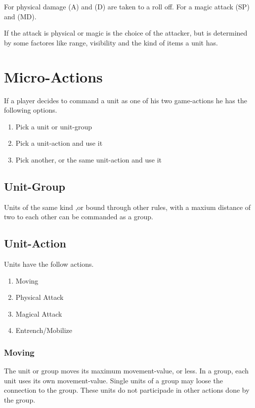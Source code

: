 \documentclass[a5paper,pagesize,10pt,bibtotoc,pointlessnumbers,
normalheadings,DIV=9,twoside=false]{scrbook}
\begin{document}
For physical damage (A) and (D) are taken to a roll off. For a magic attack (SP) and (MD).

If the attack is physical or magic is the choice of the attacker, but is determined by some factores like range, visibility and the kind of items a unit has.

\section{Micro-Actions}
If a player decides to command a unit as one of his two game-actions he has the following options.

\begin{enumerate}
\item Pick a unit or unit-group
\item Pick a unit-action and use it
\item Pick another, or the same unit-action and use it
\end{enumerate}

\subsection{Unit-Group}
Units of the same kind ,or bound through other rules, with a maxium distance of two to each other can be commanded as a group.

\subsection{Unit-Action}
Units have the follow actions.

\begin{enumerate}
\item Moving
\item Physical Attack
\item Magical Attack
\item Entrench/Mobilize
\end{enumerate}

\subsubsection{Moving}
The unit or group moves its maximum movement-value, or less.
In a group, each unit uses its own movement-value. Single units of a group may loose the connection to the group. These units do not participade in other actions done by the group.
\end{document}
